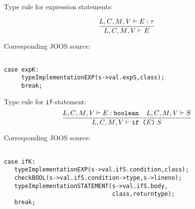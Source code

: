 \begin{slide*}
Type rule for expression statements:

$$ \frac{\mbox{$L$}{},\mbox{$C$}{},\mbox{$M$}{},\mbox{$V$}{} \vdash E: \tau}{
        \mbox{$L$}{},\mbox{$C$}{},\mbox{$M$}{},\mbox{$V$}{} \vdash E} $$

Corresponding JOOS source:
 
\begin{scriptsize}
\begin{verbatim}

case expK:
     typeImplementationEXP(s->val.expS,class);
     break;

\end{verbatim}
\end{scriptsize}

Type rule for {\tt if}-statement:
$$ \frac{\mbox{$L$}{},\mbox{$C$}{},\mbox{$M$}{},\mbox{$V$}{} \vdash E: \mbox{\tt boolean}\;\;\;\;
         \mbox{$L$}{},\mbox{$C$}{},\mbox{$M$}{},\mbox{$V$}{} \vdash S}{
         \mbox{$L$}{},\mbox{$C$}{},\mbox{$M$}{},\mbox{$V$}{} \vdash \mbox{\tt if (}E\mbox{\tt )}\;S} $$

Corresponding JOOS source:
 
\begin{scriptsize}
\begin{verbatim}
 
case ifK:
   typeImplementationEXP(s->val.ifS.condition,class);
   checkBOOL(s->val.ifS.condition->type,s->lineno);
   typeImplementationSTATEMENT(s->val.ifS.body,
                               class,returntype);
   break;

\end{verbatim}
\end{scriptsize}
\vfill
\end{slide*}
 
